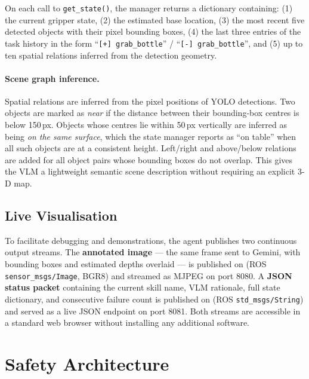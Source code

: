 On each call to \texttt{get\_state()}, the manager returns a dictionary
containing:
(1) the current gripper state,
(2) the estimated base location,
(3) the most recent five detected objects with their pixel bounding boxes,
(4) the last three entries of the task history in the form
    ``\texttt{[+] grab\_bottle}'' / ``\texttt{[-] grab\_bottle}'', and
(5) up to ten spatial relations inferred from the detection geometry.

\paragraph{Scene graph inference.}
Spatial relations are inferred from the pixel positions of YOLO detections.
Two objects are marked as \emph{near} if the distance between their bounding-box
centres is below 150\,px.
Objects whose centres lie within 50\,px vertically are inferred as being
\emph{on the same surface}, which the state manager reports as ``on table''
when all such objects are at a consistent height.
Left/right and above/below relations are added for all object pairs whose
bounding boxes do not overlap.
This gives the VLM a lightweight semantic scene description without requiring
an explicit 3-D map.

\subsection{Live Visualisation}

To facilitate debugging and demonstrations, the agent publishes two continuous
output streams.
The \textbf{annotated image} --- the same frame sent to Gemini, with bounding
boxes and estimated depths overlaid --- is published on
 (ROS \texttt{sensor\_msgs/Image}, BGR8) and
streamed as MJPEG on port 8080.
A \textbf{JSON status packet} containing the current skill name, VLM rationale,
full state dictionary, and consecutive failure count is published on
 (ROS \texttt{std\_msgs/String}) and served as a live
JSON endpoint on port 8081.
Both streams are accessible in a standard web browser without installing any
additional software.

\section{Safety Architecture}
\label{sec:safety}

